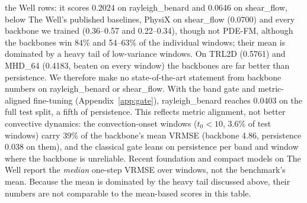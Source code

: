 \documentclass{article}
\begin{document}
the Well rows: it scores 0.2024 on rayleigh\_benard and 0.0646 on shear\_flow, below The Well's published baselines,
PhysiX on shear\_flow (0.0700) and every backbone we trained (0.36--0.57 and 0.22--0.34), though not PDE-FM, although the backbones win 84\% and 54--63\% of the individual windows; their
mean is dominated by a heavy tail of low-variance windows. On TRL2D (0.5761) and MHD\_64 (0.4183, beaten on every window) the backbones are far
better than persistence. We therefore make no state-of-the-art statement from backbone numbers on rayleigh\_benard or
shear\_flow. With the band gate and metric-aligned fine-tuning (Appendix~\ref{app:gate}), rayleigh\_benard reaches 0.0403 on
the full test split, a fifth of persistence. This reflects metric alignment, not better convective dynamics: the
convection-onset windows ($t_0<10$, 3.6\% of test windows) carry 39\% of the backbone's mean VRMSE (backbone 4.86,
persistence 0.038 on them), and the classical gate leans on persistence per band and window where the backbone is unreliable. Recent foundation and compact models on The Well \citep{mccabe2025walrus,sankaran2026wavelit} report the
\emph{median} one-step VRMSE over windows, not the benchmark's mean. Because the mean is dominated by the heavy tail
discussed above, their numbers are not comparable to the mean-based scores in this table.
\end{document}

